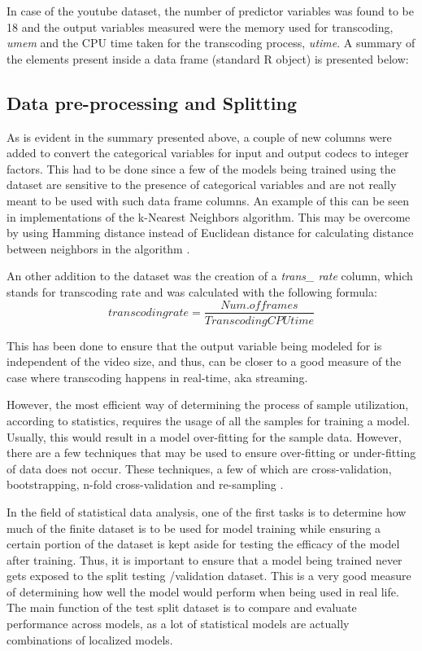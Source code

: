 \documentclass[letterpaper,12pt,titlepage,oneside,final]{report}
\begin{document}
        In case of the youtube dataset, the number of predictor variables was found to be 18 and the output variables measured were the memory used for transcoding, \textit{umem} and the CPU time taken for the transcoding process, \textit{utime}. A summary of the elements present inside a data frame (standard R object) is presented below:

        \subsection{Data pre-processing and Splitting}
            As is evident in the summary presented above, a couple of new columns were added to convert the categorical variables for input and output codecs to integer factors. This had to be done since a few of the models being trained using the dataset are sensitive to the presence of categorical variables and are not really meant to be used with such data frame columns. An example of this can be seen in implementations of the k-Nearest Neighbors algorithm. This may be overcome by using Hamming distance instead of Euclidean distance for calculating distance between neighbors in the algorithm \cite{KnnW0:online}.

            An other addition to the dataset was the creation of a \textit{trans\_ rate} column, which stands for transcoding rate and was calculated with the following formula:
            $$transcoding rate =  \frac{Num. of frames}{Transcoding CPU time}$$

            This has been done to ensure that the output variable being modeled for is independent of the video size, and thus, can be closer to a good measure of the case where transcoding happens in real-time, aka streaming. 

            However, the most efficient way of determining the process of sample utilization, according to statistics, requires the usage of all the samples for training a model. Usually, this would result in a model over-fitting for the sample data. However, there are a few techniques that may be used to ensure over-fitting or under-fitting of data does not occur. These techniques, a few of which are cross-validation, bootstrapping, n-fold cross-validation and re-sampling \cite{Kuhn2008}.

            In the field of statistical data analysis, one of the first tasks is to determine how much of the finite dataset is to be used for model training while ensuring a certain portion of the dataset is kept aside for testing the efficacy of the model after training. Thus, it is important to ensure that a model being trained never gets exposed to the split testing /validation dataset. This is a very good measure of determining how well the model would perform when being used in real life. The main function of the test split dataset is to compare and evaluate performance across models, as a lot of statistical models are actually combinations of localized models.
\end{document}
